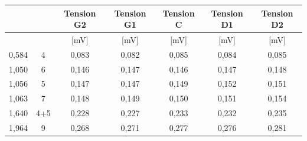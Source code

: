 \documentclass[11pt,a4paper]{report}
\begin{document}
\begin{center}
\begin{tabular}{|c|c|c|c|c|c|c|}
\hline
\rowcolor[HTML]{2A2AA1} 
\cellcolor[HTML]{963400}{\color[HTML]{FFFFFF} N}        & \cellcolor[HTML]{963400}{\color[HTML]{FFFFFF} N} & {\color[HTML]{FFFFFF} Tension G2} & {\color[HTML]{FFFFFF} Tension G1} & {\color[HTML]{FFFFFF} Tension C} & {\color[HTML]{FFFFFF} Tension D1} & {\color[HTML]{FFFFFF} Tension D2} \\ \hline
\rowcolor[HTML]{DDDDFF} 
\cellcolor[HTML]{FFECE2}{\color[HTML]{963400} {[}kg{]}} & \cellcolor[HTML]{FFECE2}{\color[HTML]{963400} }  & {\color[HTML]{2A2AA1} {[}mV{]}}   & {\color[HTML]{2A2AA1} {[}mV{]}}   & {\color[HTML]{2A2AA1} {[}mV{]}}  & {\color[HTML]{2A2AA1} {[}mV{]}}   & {\color[HTML]{2A2AA1} {[}mV{]}}   \\ \hline
{\color[HTML]{963400} 0,584}                            & {\color[HTML]{963400} 4}                         & {\color[HTML]{00009B} 0,083}      & {\color[HTML]{00009B} 0,082}      & {\color[HTML]{00009B} 0,085}     & {\color[HTML]{00009B} 0,084}      & {\color[HTML]{00009B} 0,085}      \\ \hline
{\color[HTML]{963400} 1,050}                            & {\color[HTML]{963400} 6}                         & {\color[HTML]{00009B} 0,146}      & {\color[HTML]{00009B} 0,147}      & {\color[HTML]{00009B} 0,146}     & {\color[HTML]{00009B} 0,147}      & {\color[HTML]{00009B} 0,148}      \\ \hline
{\color[HTML]{963400} 1,056}                            & {\color[HTML]{963400} 5}                         & {\color[HTML]{00009B} 0,147}      & {\color[HTML]{00009B} 0,147}      & {\color[HTML]{00009B} 0,149}     & {\color[HTML]{00009B} 0,152}      & {\color[HTML]{00009B} 0,151}      \\ \hline
{\color[HTML]{963400} 1,063}                            & {\color[HTML]{963400} 7}                         & {\color[HTML]{00009B} 0,148}      & {\color[HTML]{00009B} 0,149}      & {\color[HTML]{00009B} 0,150}     & {\color[HTML]{00009B} 0,151}      & {\color[HTML]{00009B} 0,154}      \\ \hline
{\color[HTML]{963400} 1,640}                            & {\color[HTML]{963400} 4+5}                       & {\color[HTML]{00009B} 0,228}      & {\color[HTML]{00009B} 0,227}      & {\color[HTML]{00009B} 0,233}     & {\color[HTML]{00009B} 0,232}      & {\color[HTML]{00009B} 0,235}      \\ \hline
{\color[HTML]{963400} 1,964}                            & {\color[HTML]{963400} 9}                         & {\color[HTML]{00009B} 0,268}      & {\color[HTML]{00009B} 0,271}      & {\color[HTML]{00009B} 0,277}     & {\color[HTML]{00009B} 0,276}      & {\color[HTML]{00009B} 0,281}      \\ \hline

\end{tabular}
\end{center}
\end{document}
